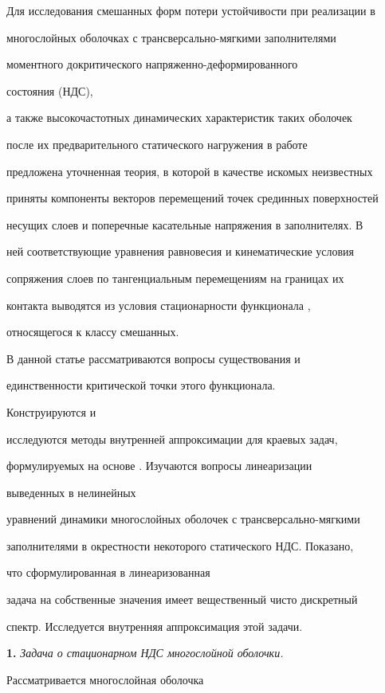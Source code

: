 Для исследования смешанных форм потери устойчивости при реализации в


многослойных оболочках с трансверсально-мяг\-ки\-ми заполнителями


моментного докритического напряженно-де\-фор\-ми\-ро\-ван\-но\-го 


состояния (НДС),


а также высокочастотных динамических характеристик таких оболочек


после их предварительного статического нагружения в работе \cite{P1}


предложена уточненная теория, в которой в качестве искомых неизвестных


приняты компоненты векторов перемещений точек срединных поверхностей


несущих слоев и поперечные касательные напряжения в заполнителях. В


ней соответствующие уравнения равновесия и кинематические условия


сопряжения слоев по тангенциальным перемещениям на границах их


контакта выводятся из условия стационарности функционала \cite{P2},


относящегося к классу смешанных.


 В данной статье рассматриваются вопросы существования и


единственности критической точки этого функционала. 


Конструируются и


исследуются методы внутренней аппроксимации для краевых задач,


формулируемых на основе \cite{P1}. Изучаются вопросы линеаризации 


выведенных в \cite{Iva} нелинейных


уравнений динамики многослойных оболочек с трансверсально-мягкими


заполнителями в окрестности некоторого статического НДС. Показано, 


что сформулированная в \cite{Iva} линеаризованная


задача на собственные значения имеет вещественный чисто дискретный


спектр. Исследуется внутренняя аппроксимация этой задачи.





{\bf 1.} {\it Задача о стационарном НДС многослойной оболочки.} 


Рассматривается многослойная оболочка


